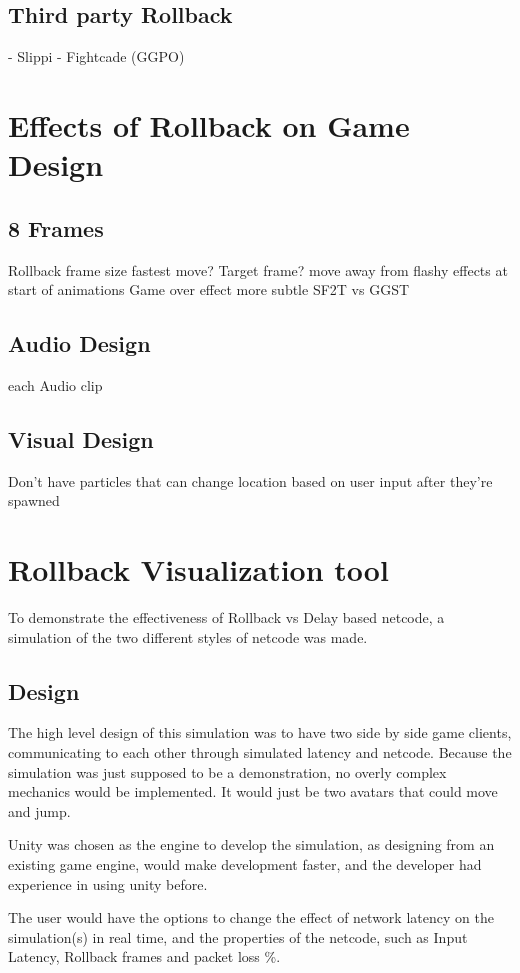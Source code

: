 \documentclass{entcs}
\begin{document}
\subsection{Third party Rollback}
- Slippi
- Fightcade (GGPO)

\section{Effects of Rollback on Game Design}
\subsection{8 Frames}
Rollback frame size fastest move? Target frame?
move away from flashy effects at start of animations
Game over effect more subtle SF2T vs GGST 
\subsection{Audio Design}
each Audio clip 
\subsection{Visual Design}
Don't have particles that can change location based on user input after they're spawned

\section{Rollback Visualization tool}
To demonstrate the effectiveness of Rollback vs Delay based netcode, a simulation of the two different styles of netcode was made.
\subsection{Design}
The high level design of this simulation was to have two side by side game clients, communicating to each other through simulated latency and netcode. Because the simulation was just supposed to be a demonstration, no overly complex mechanics would be implemented. It would just be two avatars that could move and jump.

Unity was chosen as the engine to develop the simulation, as designing from an existing game engine, would make development faster, and the developer had experience in using unity before.

The user would have the options to change the effect of network latency on the simulation(s) in real time, and the properties of the netcode, such as Input Latency, Rollback frames and packet loss \%. 
\end{document}
